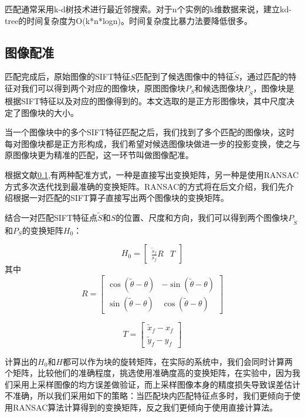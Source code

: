 \documentclass[UTF8]{csoarticle}
\begin{document}
匹配通常采用k-d树\cite{李航2012统计学习方法}技术进行最近邻搜索。对于n个实例的k维数据来说，建立kd-tree的时间复杂度为O(k*n*logn)。时间复杂度比暴力法要降低很多。

\subsection{图像配准}
匹配完成后，原始图像的SIFT特征\(S\)匹配到了候选图像中的特征\(\tilde{S}\)，通过匹配的特征对我们可以得到两个对应的图像块，原图图像块\(P_S\)和候选图像块\(P_{\tilde{S}}\)，图像块是根据SIFT特征以及对应的图像得到的。本文选取的是正方形图像块，其中尺度决定了图像块的大小。

当一个图像块中的多个SIFT特征匹配之后，我们找到了多个匹配的图像块，这时每对图像块都是正方形构成，我们希望对候选图像块做进一步的投影变换，使之与原图像块更为精准的匹配，这一环节叫做图像配准。

根据文献\ref{},有两种配准方式，一种是直接写出变换矩阵，另一种是使用RANSAC方式多次迭代找到最准确的变换矩阵。RANSAC的方式将在后文介绍，我们先介绍根据一对匹配的SIFT算子直接写出两个图像块的变换矩阵。

结合一对匹配SIFT特征点\(\tilde{S}\)和\(S\)的位置、尺度和方向，我们可以得到两个图像块\(P_{\tilde{S}}\)和\(P_S\)的变换矩阵\(H_0\)：

\begin{equation}
  H_0 = 
  \begin{bmatrix}
  \frac{\tilde{s}_f}{s_f} R & T
  \end{bmatrix}
\end{equation}
其中
\begin{equation}
  R = 
  \begin{bmatrix}
    \cos{(\tilde{\theta}-\theta)} & -\sin{(\tilde{\theta}-\theta)} \\
    \sin{(\tilde{\theta}-\theta)} & \cos{(\tilde{\theta}-\theta)} 
  \end{bmatrix}
\end{equation}

\begin{equation}
  T = 
  \begin{bmatrix}
    \tilde{x}_f - x_f \\
    \tilde{y}_f - y_f
  \end{bmatrix}
\end{equation}

计算出的\(H_0\)和\(H\)都可以作为块的旋转矩阵，在实际的系统中，我们会同时计算两个矩阵，比较他们的准确程度，挑选使用准确度高的变换矩阵，在实验中，因为我们采用上采样图像的均方误差做验证，而上采样图像本身的精度损失导致误差估计不准确，所以我们采用如下的策略：当匹配块内匹配特征点多时，我们更倾向于使用RANSAC算法计算得到的变换矩阵，反之我们更倾向于使用直接计算法。
\end{document}
